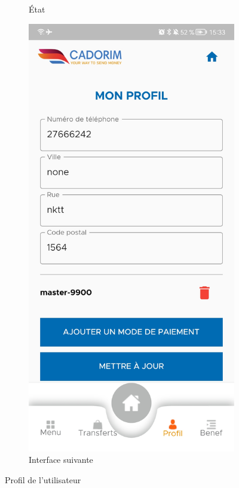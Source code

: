 \begin{figure}
\begin{subfigure}{0.3\textwidth}
			\caption{État}
			\label{fig.SICAPI}
		\end{subfigure}
		\begin{subfigure}{0.3\textwidth}
			\includegraphics[width=\hsize, valign=m]{./Template LaTeX/Images/10.jpg}
			\caption{Interface suivante}
			\label{fig.painel_sicapi}
		\end{subfigure}
		\caption{Profil de l'utilisateur
		}
		\label{fig:three graphs}
	\end{figure}
	
